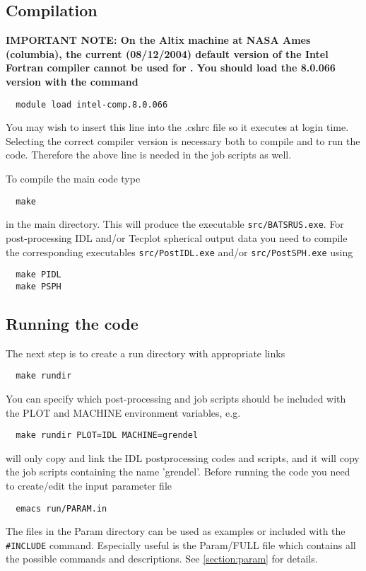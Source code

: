 \subsection{Compilation}

{\bf IMPORTANT NOTE:
On the Altix machine at NASA Ames (columbia),
the current (08/12/2004) 
default version of the Intel Fortran compiler 
cannot be used for \BATSRUS. 
You should load the 8.0.066 version with the command
\begin{verbatim}
  module load intel-comp.8.0.066
\end{verbatim}
You may wish to insert this line into the .cshrc file
so it executes at login time. 
Selecting the correct compiler version is 
necessary both to compile and to run the code.
Therefore the above line is needed in the job scripts
as well.}

To compile the main code type
\begin{verbatim}
  make
\end{verbatim}
in the main directory. This will produce the executable 
{\tt src/BATSRUS.exe}. For post-processing IDL and/or 
Tecplot spherical output data 
you need to compile the corresponding executables {\tt src/PostIDL.exe}
and/or {\tt src/PostSPH.exe} using
\begin{verbatim}
  make PIDL
  make PSPH
\end{verbatim}

\subsection{Running the code}

The next step is to create a run directory with appropriate links
\begin{verbatim}
  make rundir
\end{verbatim}
You can specify which post-processing and job scripts should be
included with the PLOT and MACHINE environment variables, e.g.
\begin{verbatim}
  make rundir PLOT=IDL MACHINE=grendel
\end{verbatim}
will only copy and link the IDL postprocessing codes and scripts,
and it will copy the job scripts containing the name 'grendel'.
Before running the code you need to create/edit the input
parameter file
\begin{verbatim}
  emacs run/PARAM.in
\end{verbatim}
The files in the Param directory can be used as examples or included
with the {\tt \#INCLUDE} command.
Especially useful is the Param/FULL file which contains
all the possible commands and descriptions.
See \ref{section:param} for details.

